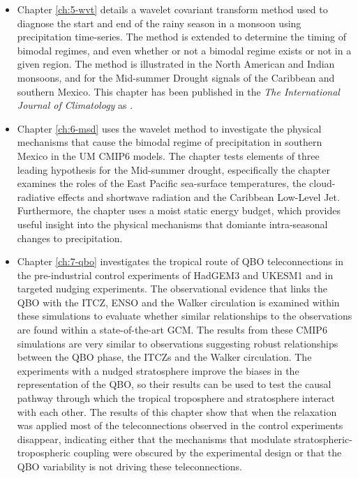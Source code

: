 \begin{itemize}
\item Chapter \ref{ch:5-wvt} details a wavelet covariant transform method used to diagnose the start and end of the rainy season in a monsoon using precipitation time-series. The method is extended to determine the timing of bimodal regimes, and even whether or not a bimodal regime exists or not in a given region. The method is illustrated in the North American and Indian monsoons, and for the Mid-summer Drought signals of the Caribbean and southern Mexico. This chapter has been published in the \textit{The International Journal of Climatology} as \cite{garciafranco2021}.
\item Chapter \ref{ch:6-msd} uses the wavelet method to investigate the physical mechanisms that cause the bimodal regime of precipitation in southern Mexico in the UM CMIP6 models. The chapter tests elements of three leading hypothesis for the Mid-summer drought, especifically the chapter examines the roles of the East Pacific sea-surface temperatures, the cloud-radiative effects and shortwave radiation and the Caribbean Low-Level Jet. Furthermore, the chapter uses a moist static energy budget, which provides useful insight into the physical mechanisms that domiante intra-seasonal changes to precipitation.
\item Chapter \ref{ch:7-qbo} investigates the tropical route of QBO teleconnections in the pre-industrial control experiments of HadGEM3 and UKESM1 and in targeted nudging experiments.
The observational evidence that links the QBO with the ITCZ, ENSO and the Walker circulation is examined within these simulations to evaluate whether similar relationships to the observations are found within a state-of-the-art GCM. 
The results from these CMIP6 simulations are very similar to observations suggesting robust relationships between the QBO phase, the ITCZs and the Walker circulation.
 The  experiments with a nudged stratosphere improve the biases in the representation of the QBO, so their results can be used to test the causal pathway through which the tropical troposphere and stratosphere interact with each other. 
The results of this chapter show that when the relaxation was applied most of the teleconnections observed in the control experiments disappear, indicating either that the mechanisms that modulate stratospheric-tropospheric coupling were obscured by the experimental design or that the QBO variability is not driving these teleconnections.
\end{itemize}